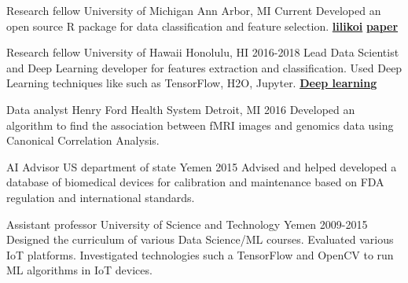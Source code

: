 \begin{cventries}

  \cventry
    {Research fellow}
    {University of Michigan}
    {Ann Arbor, MI}
    {Current}
    {
 Developed an open source R package for data classification and feature selection. \href{https://github.com/FADHLyemen/lilikoi_summary}{\textbf{lilikoi}}
 \href{https://academic.oup.com/gigascience/article/7/12/giy136/5237705}{\textbf{paper}}
    }

  \cventry
    {Research fellow}
    {University of Hawaii}
    {Honolulu, HI}
    {2016-2018}
    {
     Lead Data Scientist and Deep Learning developer for features extraction and classification. Used
    Deep Learning techniques like such as TensorFlow, H2O, Jupyter.
    \href{ https://www.ncbi.nlm.nih.gov/pubmed/29110491}{\textbf{Deep learning}}
    }

  \cventry
    {Data analyst}
    {Henry Ford Health System}
    {Detroit, MI}
    {2016}
    {
      Developed an algorithm to find the association between fMRI images and genomics data using Canonical Correlation Analysis. 
    }

  \cventry
    {AI Advisor}
    {US department of state}
    {Yemen}
    {2015}
    {
    Advised and helped developed a database of biomedical devices for calibration and maintenance based on FDA regulation and international standards.
    }

  \cventry
    {Assistant professor}
    {University of Science and Technology}
    {Yemen}
    {2009-2015}
    {
    Designed the curriculum of various
    Data Science/ML courses. Evaluated various IoT platforms. Investigated
    technologies such a TensorFlow and OpenCV to run ML algorithms in IoT
    devices.
    }
\end{cventries}


